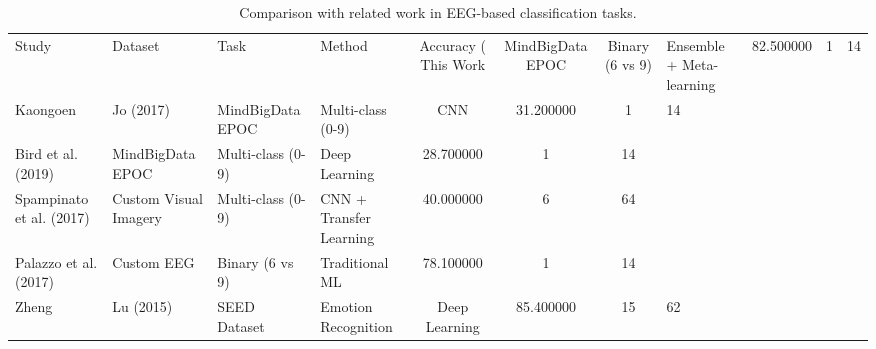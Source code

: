 \begin{table}
\caption{Comparison with related work in EEG-based classification tasks.}
\label{tab:literature_comparison}
\begin{tabular}{l|l|l|l|c|c|c}
\toprule
Study & Dataset & Task & Method & Accuracy (%
\midrule
This Work & MindBigData EPOC & Binary (6 vs 9) & Ensemble + Meta-learning & 82.500000 & 1 & 14 \\
Kaongoen & Jo (2017) & MindBigData EPOC & Multi-class (0-9) & CNN & 31.200000 & 1 & 14 \\
Bird et al. (2019) & MindBigData EPOC & Multi-class (0-9) & Deep Learning & 28.700000 & 1 & 14 \\
Spampinato et al. (2017) & Custom Visual Imagery & Multi-class (0-9) & CNN + Transfer Learning & 40.000000 & 6 & 64 \\
Palazzo et al. (2017) & Custom EEG & Binary (6 vs 9) & Traditional ML & 78.100000 & 1 & 14 \\
Zheng & Lu (2015) & SEED Dataset & Emotion Recognition & Deep Learning & 85.400000 & 15 & 62 \\
\bottomrule
\end{tabular}
\end{table}
